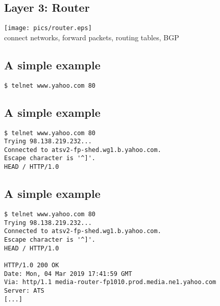 \documentclass[xga]{xdvislides}
\begin{document}
\subsection{Layer 3: Router}
\vspace*{\fill}
\begin{center}
	\texttt{[image: pics/router.eps]} \\
	connect networks, forward packets, routing tables, BGP
\end{center}
\vspace*{\fill}

\subsection{A simple example}
\Hugesize
\begin{center}
\begin{verbatim}
$ telnet www.yahoo.com 80

\end{verbatim}
\end{center}
\Normalsize
\vspace*{\fill}

\subsection{A simple example}
\Hugesize
\begin{center}
\begin{verbatim}
$ telnet www.yahoo.com 80
Trying 98.138.219.232...
Connected to atsv2-fp-shed.wg1.b.yahoo.com.
Escape character is '^]'.
HEAD / HTTP/1.0

\end{verbatim}
\end{center}
\Normalsize
\vspace*{\fill}

\subsection{A simple example}
\Hugesize
\begin{center}
\begin{verbatim}
$ telnet www.yahoo.com 80
Trying 98.138.219.232...
Connected to atsv2-fp-shed.wg1.b.yahoo.com.
Escape character is '^]'.
HEAD / HTTP/1.0

HTTP/1.0 200 OK
Date: Mon, 04 Mar 2019 17:41:59 GMT
Via: http/1.1 media-router-fp1010.prod.media.ne1.yahoo.com
Server: ATS
[...]
\end{verbatim}
\end{center}
\Normalsize
\vspace*{\fill}
\end{document}
